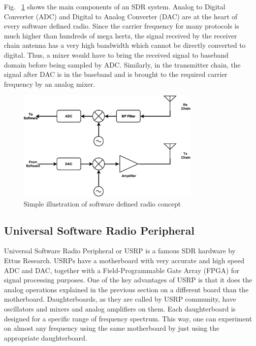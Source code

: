 Fig.~ \ref{fig:sdr} shows the main components of an SDR system. Analog to Digital Converter (ADC) and Digital to Analog Converter (DAC) are at the heart of every software defined radio. Since the carrier frequency for many protocols is much higher than hundreds of mega hertz, the signal received by the receiver chain antenna has a very high bandwidth which cannot be directly converted to digital. Thus, a mixer would have to bring the received signal to baseband domain before being sampled by ADC. Similarly, in the transmitter chain, the signal after DAC is in the baseband and is brought to the required carrier frequency by an analog mixer.

\begin{figure} [th]
    \centering
    \includegraphics[width=0.8\textwidth]{figures/sdr.pdf}
    \caption{Simple illustration of software defined radio concept} \label{fig:sdr}
\end{figure}

\subsection{Universal Software Radio Peripheral}

Universal Software Radio Peripheral or USRP is a famous SDR hardware by Ettus Research. USRPs have a motherboard with very accurate and high speed ADC and DAC, together with a Field-Programmable Gate Array (FPGA) for signal processing purposes. One of the key advantages of USRP is that it does the analog operations explained in the previous section on a different board than the motherboard. Daughterboards, as they are called by USRP community, have oscillators and mixers and analog amplifiers on them. Each daughterboard is designed for a specific range of frequency spectrum. This way, one can experiment on almost any frequency using the same motherboard by just using the appropriate daughterboard.

